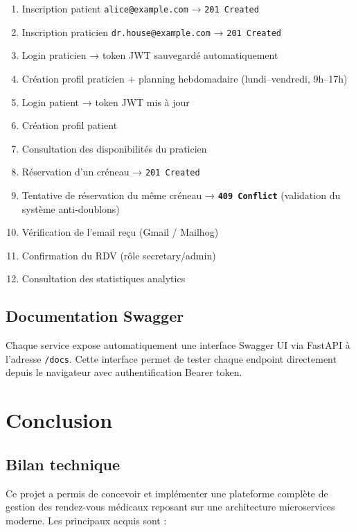 \documentclass[12pt,a4paper]{article}
\begin{document}
\begin{enumerate}
  \item Inscription patient \texttt{alice@example.com} → \texttt{201 Created}
  \item Inscription praticien \texttt{dr.house@example.com} → \texttt{201 Created}
  \item Login praticien → token JWT sauvegardé automatiquement
  \item Création profil praticien + planning hebdomadaire (lundi–vendredi, 9h–17h)
  \item Login patient → token JWT mis à jour
  \item Création profil patient
  \item Consultation des disponibilités du praticien
  \item Réservation d'un créneau → \texttt{201 Created}
  \item Tentative de réservation du même créneau → \textbf{\texttt{409 Conflict}} (validation du système anti-doublons)
  \item Vérification de l'email reçu (Gmail / Mailhog)
  \item Confirmation du RDV (rôle secretary/admin)
  \item Consultation des statistiques analytics
\end{enumerate}

\subsection{Documentation Swagger}

Chaque service expose automatiquement une interface Swagger UI via FastAPI à l'adresse \texttt{/docs}. Cette interface permet de tester chaque endpoint directement depuis le navigateur avec authentification Bearer token.

\section{Conclusion}

\subsection{Bilan technique}

Ce projet a permis de concevoir et implémenter une plateforme complète de gestion des rendez-vous médicaux reposant sur une architecture microservices moderne. Les principaux acquis sont :
\end{document}
